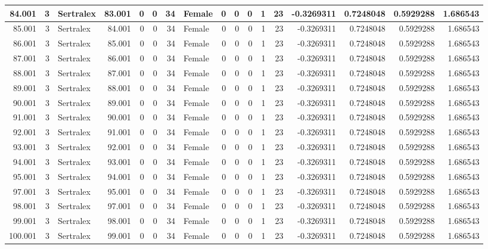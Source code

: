 \documentclass[
]{book}
\begin{document}
\begin{table}
\begin{tabular}[t]{r|r|l|r|r|r|r|l|r|r|r|r|r|r|r|r|r}
\hline
84.001 & 3 & Sertralex & 83.001 & 0 & 0 & 34 & Female & 0 & 0 & 0 & 1 & 23 & -0.3269311 & 0.7248048 & 0.5929288 & 1.686543\\
\hline
85.001 & 3 & Sertralex & 84.001 & 0 & 0 & 34 & Female & 0 & 0 & 0 & 1 & 23 & -0.3269311 & 0.7248048 & 0.5929288 & 1.686543\\
\hline
86.001 & 3 & Sertralex & 85.001 & 0 & 0 & 34 & Female & 0 & 0 & 0 & 1 & 23 & -0.3269311 & 0.7248048 & 0.5929288 & 1.686543\\
\hline
87.001 & 3 & Sertralex & 86.001 & 0 & 0 & 34 & Female & 0 & 0 & 0 & 1 & 23 & -0.3269311 & 0.7248048 & 0.5929288 & 1.686543\\
\hline
88.001 & 3 & Sertralex & 87.001 & 0 & 0 & 34 & Female & 0 & 0 & 0 & 1 & 23 & -0.3269311 & 0.7248048 & 0.5929288 & 1.686543\\
\hline
89.001 & 3 & Sertralex & 88.001 & 0 & 0 & 34 & Female & 0 & 0 & 0 & 1 & 23 & -0.3269311 & 0.7248048 & 0.5929288 & 1.686543\\
\hline
90.001 & 3 & Sertralex & 89.001 & 0 & 0 & 34 & Female & 0 & 0 & 0 & 1 & 23 & -0.3269311 & 0.7248048 & 0.5929288 & 1.686543\\
\hline
91.001 & 3 & Sertralex & 90.001 & 0 & 0 & 34 & Female & 0 & 0 & 0 & 1 & 23 & -0.3269311 & 0.7248048 & 0.5929288 & 1.686543\\
\hline
92.001 & 3 & Sertralex & 91.001 & 0 & 0 & 34 & Female & 0 & 0 & 0 & 1 & 23 & -0.3269311 & 0.7248048 & 0.5929288 & 1.686543\\
\hline
93.001 & 3 & Sertralex & 92.001 & 0 & 0 & 34 & Female & 0 & 0 & 0 & 1 & 23 & -0.3269311 & 0.7248048 & 0.5929288 & 1.686543\\
\hline
94.001 & 3 & Sertralex & 93.001 & 0 & 0 & 34 & Female & 0 & 0 & 0 & 1 & 23 & -0.3269311 & 0.7248048 & 0.5929288 & 1.686543\\
\hline
95.001 & 3 & Sertralex & 94.001 & 0 & 0 & 34 & Female & 0 & 0 & 0 & 1 & 23 & -0.3269311 & 0.7248048 & 0.5929288 & 1.686543\\
\hline
97.001 & 3 & Sertralex & 95.001 & 0 & 0 & 34 & Female & 0 & 0 & 0 & 1 & 23 & -0.3269311 & 0.7248048 & 0.5929288 & 1.686543\\
\hline
98.001 & 3 & Sertralex & 97.001 & 0 & 0 & 34 & Female & 0 & 0 & 0 & 1 & 23 & -0.3269311 & 0.7248048 & 0.5929288 & 1.686543\\
\hline
99.001 & 3 & Sertralex & 98.001 & 0 & 0 & 34 & Female & 0 & 0 & 0 & 1 & 23 & -0.3269311 & 0.7248048 & 0.5929288 & 1.686543\\
\hline
100.001 & 3 & Sertralex & 99.001 & 0 & 0 & 34 & Female & 0 & 0 & 0 & 1 & 23 & -0.3269311 & 0.7248048 & 0.5929288 & 1.686543\\

\end{tabular}
\end{table}
\end{document}
